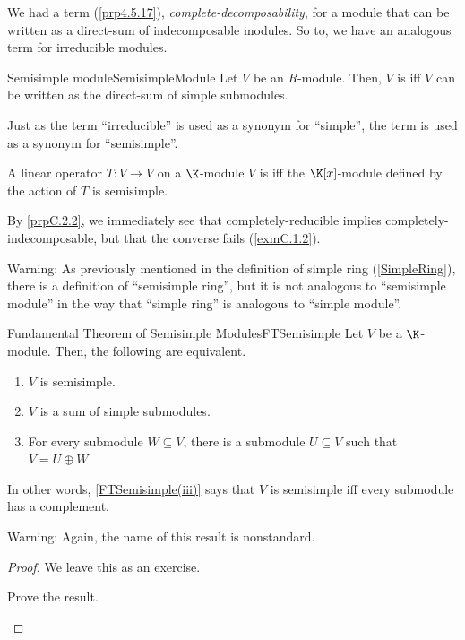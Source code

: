 We had a term (\cref{prp4.5.17}), \emph{complete-decomposability}, for a module that can be written as a direct-sum of indecomposable modules.  So to, we have an analogous term for irreducible modules.
\begin{dfn}{Semisimple module}{SemisimpleModule}
	Let $V$ be an $R$-module.  Then, $V$ is  iff $V$ can be written as the direct-sum of simple submodules.
	\begin{rmk}
		Just as the term ``irreducible'' is used as a synonym for ``simple'', the term  is used as a synonym for ``semisimple''.
	\end{rmk}
	\begin{rmk}
		A linear operator $T\colon V\rightarrow V$ on a $\K$-module $V$ is  iff the $\K [x]$-module defined by the action of $T$ is semisimple.
	\end{rmk}
	\begin{rmk}
		By \cref{prpC.2.2}, we immediately see that completely-reducible implies completely-indecomposable, but that the converse fails (\cref{exmC.1.2}).
	\end{rmk}
	\begin{rmk}
		Warning:  As previously mentioned in the definition of simple ring (\cref{SimpleRing}), there is a definition of ``semisimple ring'', but it is not analogous to ``semisimple module'' in the way that ``simple ring'' is analogous to ``simple module''.
	\end{rmk}
\end{dfn}
\begin{thm}{Fundamental Theorem of Semisimple Modules}{FTSemisimple}
	Let $V$ be a $\K$-module.  Then, the following are equivalent.
	\begin{enumerate}
		\item \label{FTSemisimple(i)}$V$ is semisimple.
		\item \label{FTSemisimple(ii)}$V$ is a sum of simple submodules.
		\item \label{FTSemisimple(iii)}For every submodule $W\subseteq V$, there is a submodule $U\subseteq V$ such that $V=U\oplus W$.
	\end{enumerate}
	\begin{rmk}
		In other words, \cref{FTSemisimple(iii)} says that $V$ is semisimple iff every submodule has a complement.
	\end{rmk}
	\begin{rmk}
		Warning:  Again, the name of this result is nonstandard.
	\end{rmk}
	\begin{proof}
		We leave this as an exercise.
		\begin{exr}[breakable=false]{}{}
			Prove the result.
		\end{exr}
	\end{proof}
\end{thm}
